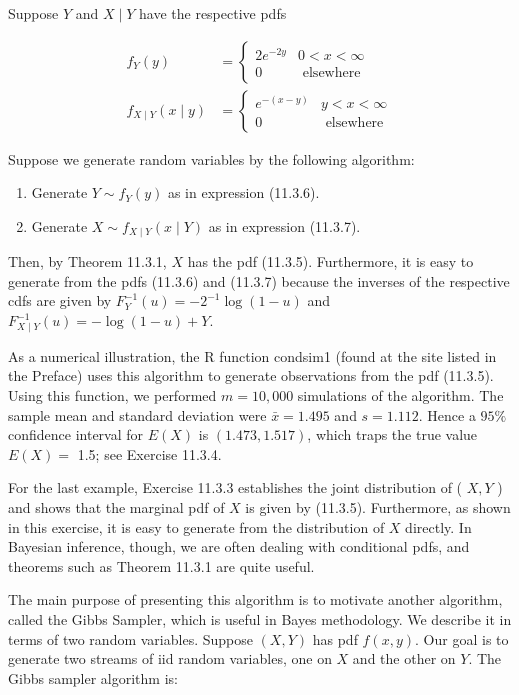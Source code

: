 Suppose $Y$ and $X \mid Y$ have the respective pdfs


\begin{align*}
f_{Y}(y) & = \begin{cases}2 e^{-2 y} & 0<x<\infty \\
0 & \text { elsewhere }\end{cases}  \tag{11.3.6}\\
f_{X \mid Y}(x \mid y) & = \begin{cases}e^{-(x-y)} & y<x<\infty \\
0 & \text { elsewhere }\end{cases} \tag{11.3.7}
\end{align*}


Suppose we generate random variables by the following algorithm:

\begin{enumerate}
  \item Generate $Y \sim f_{Y}(y)$ as in expression (11.3.6).
  \item Generate $X \sim f_{X \mid Y}(x \mid Y)$ as in expression (11.3.7).
\end{enumerate}

Then, by Theorem 11.3.1, $X$ has the pdf (11.3.5). Furthermore, it is easy to generate from the pdfs (11.3.6) and (11.3.7) because the inverses of the respective cdfs are given by $F_{Y}^{-1}(u)=-2^{-1} \log (1-u)$ and $F_{X \mid Y}^{-1}(u)=-\log (1-u)+Y$.

As a numerical illustration, the R function condsim1 (found at the site listed in the Preface) uses this algorithm to generate observations from the pdf (11.3.5). Using this function, we performed $m=10,000$ simulations of the algorithm. The sample mean and standard deviation were $\bar{x}=1.495$ and $s=1.112$. Hence a $95 \%$ confidence interval for $E(X)$ is $(1.473,1.517)$, which traps the true value $E(X)=$ 1.5; see Exercise 11.3.4.

For the last example, Exercise 11.3.3 establishes the joint distribution of ( $X, Y$ ) and shows that the marginal pdf of $X$ is given by (11.3.5). Furthermore, as shown in this exercise, it is easy to generate from the distribution of $X$ directly. In Bayesian inference, though, we are often dealing with conditional pdfs, and theorems such as Theorem 11.3.1 are quite useful.

The main purpose of presenting this algorithm is to motivate another algorithm, called the Gibbs Sampler, which is useful in Bayes methodology. We describe it in terms of two random variables. Suppose $(X, Y)$ has pdf $f(x, y)$. Our goal is to generate two streams of iid random variables, one on $X$ and the other on $Y$. The Gibbs sampler algorithm is:

